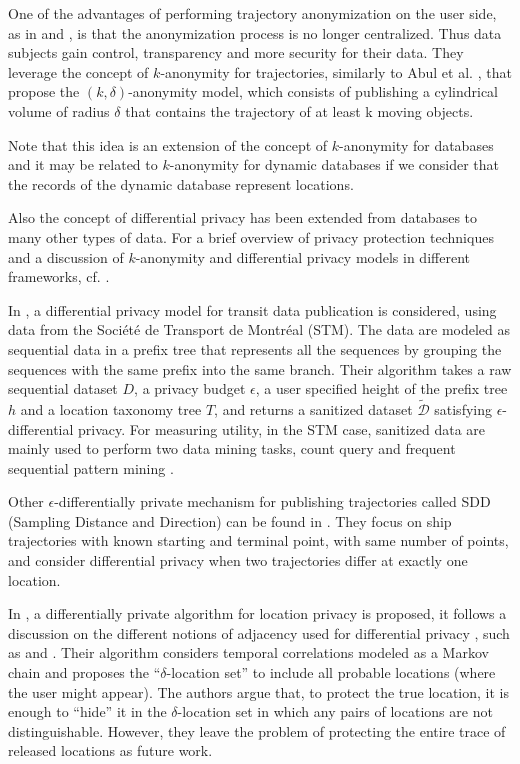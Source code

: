 \documentclass{llncs}
\begin{document}
One of the advantages of performing trajectory anonymization on the user side, as in \cite{Romero-Tris2016} and \cite{Romero-Tris:2018}, is that the anonymization process is no longer centralized. Thus data subjects gain control, transparency and more security for their data.
They leverage the concept of $k$-anonymity for trajectories, similarly to Abul et al. \cite{Abul2008}, that propose the $(k, \delta)$-anonymity model, which consists of publishing a cylindrical volume of radius $\delta$ that contains the trajectory of at least k moving objects. 

Note that this idea is an extension of the concept of $k$-anonymity for databases \cite{Samarati:1998} and it may be related to $k$-anonymity for dynamic databases \cite{Salas:2018-b} if we consider that the records of the dynamic database represent locations.

Also the concept of differential privacy \cite{Dwork:2006} has been extended from databases to many other types of data.
For a brief overview of privacy protection techniques and a discussion of $k$-anonymity and differential privacy models in different frameworks, cf. \cite{Salas:2018}.


In \cite{Chen:2012}, a differential privacy model for transit data publication is considered, using data from the Soci\'{e}t\'{e} de Transport de Montr\'{e}al (STM). The data are modeled as sequential data in a prefix tree that represents all the sequences by grouping the sequences with the same prefix into the same branch.
Their algorithm takes a raw sequential dataset $D$, a privacy budget $\epsilon$, a user specified height of the prefix tree $h$ and a location taxonomy tree $T$, and returns a sanitized dataset $\tilde{\mathcal{D}}$ satisfying $\epsilon$-differential privacy.
For measuring utility, in the STM case, sanitized data are mainly used to perform two
data mining tasks, count query and frequent sequential pattern mining \cite{Agrawal:1995}.


Other $\epsilon$-differentially private mechanism for publishing trajectories called SDD (Sampling Distance and Direction) can be found in \cite{Jiang:2013}.
They focus on ship trajectories with known starting and terminal point, with same number of points, and consider differential privacy when two trajectories differ at exactly one location.


In \cite{Xiao:2015}, a differentially private algorithm for location privacy is proposed, it follows a discussion on the different notions of adjacency used for  differential privacy , such as \cite{Chatzik:2013} and  \cite{Kifer:2011}.
Their algorithm considers temporal correlations modeled as a Markov chain and proposes the ``$\delta$-location set'' to include all probable locations (where the user might appear). The authors argue that, to protect the true location, it is enough to “hide” it in the $\delta$-location set in which any pairs of locations are not distinguishable.
However, they leave the problem of protecting the entire trace of released locations as future work.
\end{document}
